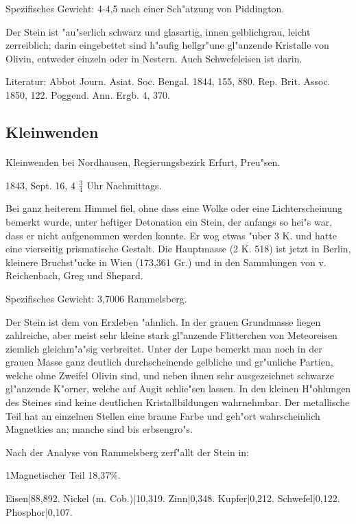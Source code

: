 \documentclass[a4paper, 11pt, oneside]{article}
\begin{document}
Spezifisches Gewicht: 4-4,5 nach einer Sch"atzung von Piddington.

Der Stein ist "au"serlich schwarz und glasartig, innen gelblichgrau, leicht zerreiblich; darin eingebettet sind h"aufig hellgr"une gl"anzende Kristalle von Olivin, entweder einzeln oder in Nestern. Auch Schwefeleisen ist darin.

\footnotesize
Literatur: Abbot Journ. Asiat. Soc. Bengal. 1844, 155, 880. Rep. Brit. Assoc. 1850, 122. Poggend. Ann. Ergb. 4, 370.

\subsection{Kleinwenden}
\normalsize
\paragraph{}
Kleinwenden bei Nordhausen, Regierungsbezirk Erfurt, Preu"sen.

1843, Sept. 16, 4 $\frac{3}{4}$ Uhr Nachmittags.

Bei ganz heiterem Himmel fiel, ohne dass eine Wolke oder eine Lichterscheinung bemerkt wurde, unter heftiger Detonation ein Stein, der anfangs so hei"s war, dass er nicht aufgenommen werden konnte. Er wog etwas "uber 3 K. und hatte eine vierseitig prismatische Gestalt. Die Hauptmasse (2 K. 518) ist jetzt in Berlin, kleinere Bruchst"ucke in Wien (173,361 Gr.) und in den Sammlungen von v. Reichenbach, Greg und Shepard.

Spezifisches Gewicht: 3,7006 Rammelsberg.

Der Stein ist dem von Erxleben "ahnlich. In der grauen Grundmasse liegen zahlreiche, aber meist sehr kleine stark gl"anzende Flitterchen von Meteoreisen ziemlich gleichm"a"sig verbreitet. Unter der Lupe bemerkt man noch in der grauen Masse ganz deutlich durchscheinende gelbliche und gr"unliche Partien, welche ohne Zweifel Olivin sind, und neben ihnen sehr ausgezeichnet schwarze gl"anzende K"orner, welche auf Augit schlie"sen lassen. In den kleinen H"ohlungen des Steines sind keine deutlichen Kristallbildungen wahrnehmbar. Der metallische Teil hat an einzelnen Stellen eine braune Farbe und geh"ort wahrscheinlich Magnetkies an; manche sind bis erbsengro"s.

Nach der Analyse von Rammelsberg zerf"allt der Stein in:

1\. Magnetischer Teil 18,37\%.

Eisen|88,892.  
Nickel (m. Cob.)|10,319.  
Zinn|0,348.  
Kupfer|0,212.  
Schwefel|0,122.  
Phosphor|0,107.
\end{document}
